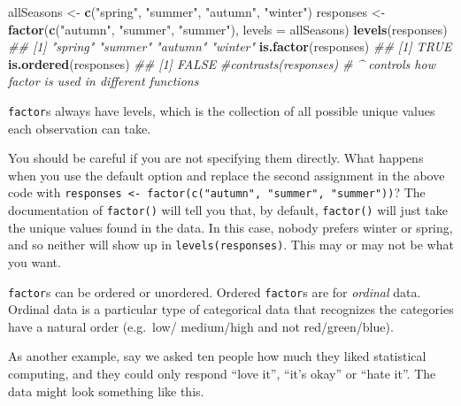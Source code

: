 \documentclass[12pt,krantz2]{krantz}
\makeatletter
\newenvironment{Shaded}{\begin{snugshade}}{\end{snugshade}}
\newcommand{\CommentTok}[1]{\textcolor[rgb]{0.37,0.37,0.37}{\textit{#1}}}
\newcommand{\DataTypeTok}[1]{\textcolor[rgb]{0.27,0.27,0.27}{#1}}
\newcommand{\KeywordTok}[1]{\textcolor[rgb]{0.27,0.27,0.27}{\textbf{#1}}}
\newcommand{\NormalTok}[1]{#1}
\newcommand{\StringTok}[1]{\textcolor[rgb]{0.5,0.5,0.5}{#1}}
\newenvironment{kframe}{%
\medskip{}
\setlength{\fboxsep}{.8em}
 \def\at@end@of@kframe{}%
 \ifinner\ifhmode%
  \def\at@end@of@kframe{\end{minipage}}%
  \begin{minipage}{\columnwidth}%
 \fi\fi%
 \def\FrameCommand##1{\hskip\@totalleftmargin \hskip-\fboxsep
 \colorbox{shadecolor}{##1}\hskip-\fboxsep
     \hskip-\linewidth \hskip-\@totalleftmargin \hskip\columnwidth}%
 \MakeFramed {\advance\hsize-\width
   \@totalleftmargin\z@ \linewidth\hsize
   \@setminipage}}%
 {\par\unskip\endMakeFramed%
 \at@end@of@kframe}
\renewenvironment{Shaded}{\begin{kframe}}{\end{kframe}}
\makeatother
\begin{document}
\begin{Shaded}
\begin{Highlighting}[]
\NormalTok{allSeasons <-}\StringTok{ }\KeywordTok{c}\NormalTok{(}\StringTok{"spring"}\NormalTok{, }\StringTok{"summer"}\NormalTok{, }\StringTok{"autumn"}\NormalTok{, }\StringTok{"winter"}\NormalTok{)}
\NormalTok{responses <-}\StringTok{ }\KeywordTok{factor}\NormalTok{(}\KeywordTok{c}\NormalTok{(}\StringTok{"autumn"}\NormalTok{, }\StringTok{"summer"}\NormalTok{, }\StringTok{"summer"}\NormalTok{), }
                    \DataTypeTok{levels =}\NormalTok{ allSeasons)}
\KeywordTok{levels}\NormalTok{(responses)}
\CommentTok{## [1] "spring" "summer" "autumn" "winter"}
\KeywordTok{is.factor}\NormalTok{(responses)}
\CommentTok{## [1] TRUE}
\KeywordTok{is.ordered}\NormalTok{(responses)}
\CommentTok{## [1] FALSE}
\CommentTok{#contrasts(responses) }
\CommentTok{# ^ controls how factor is used in different  functions}
\end{Highlighting}
\end{Shaded}

\texttt{factor}s always have levels, which is the collection of all possible unique values each observation can take.

\begin{rmd-caution}
You should be careful if you are not specifying them directly. What happens when you use the default option and replace the second assignment in the above code with \texttt{responses\ \textless{}-\ factor(c("autumn",\ "summer",\ "summer"))}? The documentation of \texttt{factor()} will tell you that, by default, \texttt{factor()} will just take the unique values found in the data. In this case, nobody prefers winter or spring, and so neither will show up in \texttt{levels(responses)}. This may or may not be what you want.

\end{rmd-caution}

\texttt{factor}s can be ordered or unordered. Ordered \texttt{factor}s are for \emph{ordinal} data. Ordinal data is a particular type of categorical data that recognizes the categories have a natural order (e.g.~low/ medium/high and not red/green/blue).

As another example, say we asked ten people how much they liked statistical computing, and they could only respond ``love it'', ``it's okay'' or ``hate it''. The data might look something like this.
\end{document}
